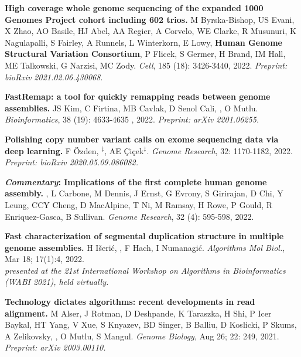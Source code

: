 \vspace{-.2cm}
{\bf High coverage whole genome sequencing of the expanded 1000 Genomes Project cohort including 602 trios.}  M Byrska-Bishop, US Evani, X Zhao, AO Basile, HJ Abel, AA Regier, A Corvelo, WE Clarke, R Musunuri, K Nagulapalli, S Fairley, A Runnels, L Winterkorn, E Lowy, \textbf{Human Genome Structural Variation Consortium}, P Flicek, S Germer, H Brand, IM Hall, ME Talkowski,  G Narzisi, MC Zody. {\it Cell}, 185 (18): 3426-3440, 2022.
\textit{Preprint: bioRxiv 2021.02.06.430068}.\\
\hspace*{1cm}
          {\footnotesize \em {}}



\vspace{-.2cm}
{\bf FastRemap: a tool for quickly remapping reads between genome assemblies.}
JS Kim, C Firtina, MB Cavlak, D Senol Cali, \calkan{}, O Mutlu.
{\it Bioinformatics}, 38 (19): 4633-4635 , 2022. \textit {Preprint: arXiv 2201.06255.}

\vspace{-.2cm}
{\bf Polishing copy number variant calls on exome sequencing data via deep learning.}
F Özden, \calkan{}$^\ddag$, AE Çiçek$^\ddag$. {\it Genome Research}, 32: 1170-1182, 2022. \textit {Preprint: bioRxiv 2020.05.09.086082.}


\vspace{-.2cm}
{\bf \textit{Commentary}: Implications of the first complete human genome assembly.} \calkan{}, L Carbone, M Dennis, J Ernst, G Evrony, S Girirajan, D Chi, Y Leung, CCY Cheng, D MacAlpine, T Ni, M Ramsay, H Rowe, P Gould, R Enriquez-Gasca, B Sullivan. {\it Genome Research}, 32 (4): 595-598, 2022.


\vspace{-.2cm}
{\bf Fast characterization of segmental duplication structure in multiple genome assemblies.}
H Išerić, \calkan{}, F Hach, I Numanagić.
{\it Algorithms Mol Biol.}, Mar 18; 17(1):4, 2022.\\
         \hspace*{1cm}
          {\footnotesize \em presented at the 21st International Workshop on Algorithms in Bioinformatics (WABI 2021), held virtually.}


\vspace{-.2cm}
{\bf Technology dictates algorithms: recent developments in read alignment.}
M Alser, J Rotman, D Deshpande, K Taraszka, H Shi, P Icer Baykal, HT Yang, V Xue, S Knyazev, BD Singer, B Balliu, D Koslicki, P Skums, A Zelikovsky, \calkan{}, O Mutlu, S Mangul.
{\it Genome Biology}, Aug 26; 22: 249, 2021.
\textit{Preprint: arXiv 2003.00110.}

